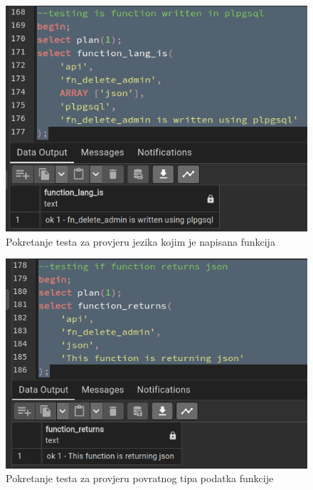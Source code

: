 				\begin{figure}[H]
					\centering
					\includegraphics[width=\textwidth]{slike/unit_tests/ut_3/func_lang.png}
					\caption{Pokretanje testa za provjeru jezika kojim je napisana funkcija}
					\label{fig: IS3-function_lang}
				\end{figure}
				\begin{figure}[H]
					\centering
					\includegraphics[width=\textwidth]{slike/unit_tests/ut_3/func_return.png}
					\caption{Pokretanje testa za provjeru povratnog tipa podatka funkcije}
					\label{fig: IS3-function_return}
				\end{figure}
